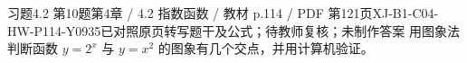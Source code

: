 \par\noindent\begin{minipage}{\linewidth}
\begin{bankitem}{习题4.2 第10题}{第4章 / 4.2 指数函数 / 教材 p.114 / PDF 第121页}{XJ-B1-C04-HW-P114-Y0935}{已对照原页转写题干及公式；待教师复核；未制作答案}
用图象法判断函数 $y=2^x$ 与 $y=x^2$ 的图象有几个交点，并用计算机验证。
\end{bankitem}
\end{minipage}\par\medskip
